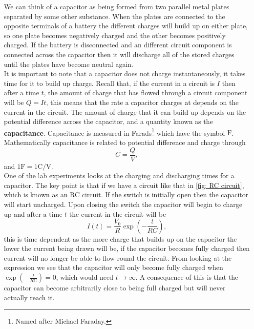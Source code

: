 \documentclass[a4paper,12pt]{book}
\begin{document}
We can think of a capacitor as being formed from two parallel metal plates separated by some other substance. When the plates are connected to the opposite terminals of a battery the different charges will build up on either plate, so one plate becomes negatively charged and the other becomes positively charged. If the battery is disconnected and an different circuit component is connected across the capacitor then it will discharge all of the stored charges until the plates have become neutral again.\\

It is important to note that a capacitor does not charge instantaneously, it takes time for it to build up charge. Recall that, if the current in a circuit is $I$ then after a time $t$, the amount of charge that has flowed through a circuit component will be $Q=It$, this means that the rate a capacitor charges at depends on the current in the circuit.  The amount of charge that it can build up depends on the potential difference across the capacitor, and a quantity known as the \textbf{capacitance}. Capacitance is measured in Farads\footnote{Named after Michael Faraday.} which have the symbol $\text{F}$. Mathematically capacitance is related to potential difference and charge through
\begin{equation}
C=\frac{Q}{V},
\label{eq: capacitance eq}
\end{equation} 
and $1\text{F}=1\text{C/V}$.\\

One of the lab experiments looks at the charging and discharging times for a capacitor. The key point is that if we have a circuit like that in \cref{fig: RC circuit}, which is known as an RC circuit. If the switch is initially open then the capacitor will start uncharged. Upon closing the switch the capacitor will begin to charge up and after a time $t$ the current in the circuit will be
\begin{equation*}
I(t)=\frac{V_{0}}{R}\exp\left(-\frac{t}{RC}\right),
\end{equation*}
this is time dependent as the more charge that builds up on the capacitor the lower the current being drawn will be, if the capacitor becomes fully charged then current will no longer be able to flow round the circuit. From looking at the expression we see that the capacitor will only become fully charged when $\exp\left(-\frac{t}{RC}\right)=0$, which would need $t\to \infty$. A consequence of this is that the capacitor can become arbitrarily close to being full charged but will never actually reach it.\\
\end{document}
